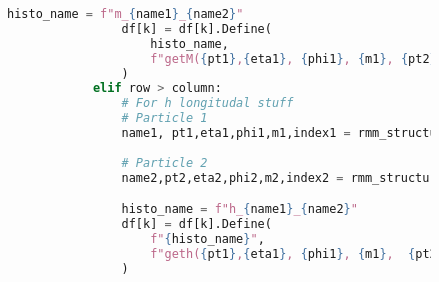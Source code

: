 \begin{figure}[H]
\begin{lstlisting}[language=Python, style=pythonstyle, label={code:RMM_implementation}]
                histo_name = f"m_{name1}_{name2}"
                df[k] = df[k].Define(
                    histo_name,
                    f"getM({pt1},{eta1}, {phi1}, {m1}, {pt2}, {eta2}, {phi2}, {m2}, {index1}, {index2})",
                )
            elif row > column:
                # For h longitudal stuff
                # Particle 1
                name1, pt1,eta1,phi1,m1,index1 = rmm_structure[row]
                
                # Particle 2
                name2,pt2,eta2,phi2,m2,index2 = rmm_structure[column]

                histo_name = f"h_{name1}_{name2}"
                df[k] = df[k].Define(
                    f"{histo_name}",
                    f"geth({pt1},{eta1}, {phi1}, {m1},  {pt2}, {eta2}, {phi2}, {m2},  {index1}, {index2})",
                )
                
\end{lstlisting}
\end{figure}